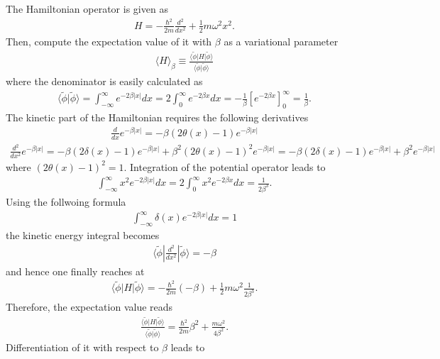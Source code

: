 \documentclass{jlreq}
\begin{document}
The Hamiltonian operator is given as
\begin{align}
    H=-\frac{\hbar^2}{2m}\frac{d^2}{dx^2}+\frac{1}{2}m\omega^2x^2.
\end{align}
Then, compute the expectation value of it with $\beta$ as a variational parameter
\begin{align}
    \langle H\rangle_\beta\equiv\frac{\langle\tilde{\phi}|H|\tilde{\phi}\rangle}{\langle\tilde{\phi}|\tilde{\phi}\rangle}
\end{align}
where the denominator is easily calculated as
\begin{align}
    \langle\tilde{\phi}|\tilde{\phi}\rangle=\int^\infty_{-\infty}e^{-2\beta|x|} dx=2\int^\infty_{0}e^{-2\beta x} dx = -\frac{1}{\beta}[e^{-2\beta x}]^\infty_0=\frac{1}{\beta}.
\end{align}
The kinetic part of the Hamiltonian requires the following derivatives
\begin{align}
    \frac{d}{dx}e^{-\beta |x|}=-\beta (2\theta(x)-1)e^{-\beta |x|}
\end{align}
\begin{align}
    \frac{d^2}{dx^2}e^{-\beta |x|}=-\beta (2\delta(x)-1)e^{-\beta |x|}+\beta^2 (2\theta(x)-1)^2 e^{-\beta |x|}=-\beta (2\delta(x)-1)e^{-\beta |x|}+\beta^2 e^{-\beta |x|}
\end{align}
where $(2\theta(x)-1)^2=1$. Integration of the potential operator leads to
\begin{align}
    \int^\infty_{-\infty} x^2 e^{-2\beta|x|}dx=2\int^{\infty}_0 x^2 e^{-2\beta x}dx=\frac{1}{2\beta^3}.
\end{align}
Using the follwoing formula
\begin{align}
    \int^\infty_{-\infty} \delta(x) e^{-2\beta|x|}dx=1
\end{align}
the kinetic energy integral becomes
\begin{align}
    \langle\tilde{\phi}|\frac{d^2}{dx^2}|\tilde{\phi}\rangle=-\beta
\end{align}
and hence one finally reaches at
\begin{align}
    \langle\tilde{\phi}|H|\tilde{\phi}\rangle=-\frac{\hbar^2}{2m}(-\beta)+\frac{1}{2}m\omega^2\frac{1}{2\beta^3}.
\end{align}
Therefore, the expectation value reads
\begin{align}
    \frac{\langle\tilde{\phi}|H|\tilde{\phi}\rangle}{\langle\tilde{\phi}|\tilde{\phi}\rangle}=\frac{\hbar^2}{2m}\beta^2+\frac{m\omega^2}{4\beta^2}.
\end{align}
Differentiation of it with respect to $\beta$ leads to
\end{document}
